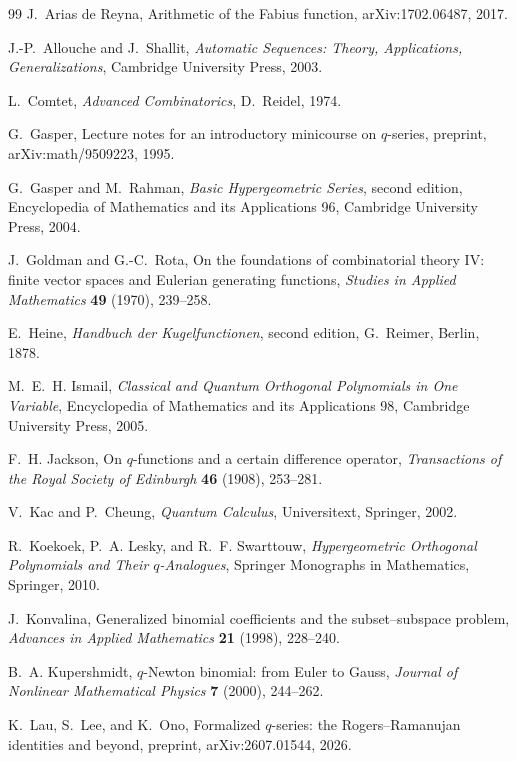 \documentclass[11pt,oneside,openany]{book}
\theoremstyle{definition}
\theoremstyle{remark}
\begin{document}
\begin{thebibliography}{99}
J.~Arias de Reyna,
Arithmetic of the Fabius function,
arXiv:1702.06487, 2017.

J.-P.~Allouche and J.~Shallit,
\emph{Automatic Sequences: Theory, Applications, Generalizations},
Cambridge University Press, 2003.

L.~Comtet,
\emph{Advanced Combinatorics},
D.~Reidel, 1974.

G.~Gasper,
Lecture notes for an introductory minicourse on $q$-series,
preprint, arXiv:math/9509223, 1995.

G.~Gasper and M.~Rahman,
\emph{Basic Hypergeometric Series}, second edition,
Encyclopedia of Mathematics and its Applications 96, Cambridge University Press, 2004.

J.~Goldman and G.-C.~Rota,
On the foundations of combinatorial theory IV: finite vector spaces and Eulerian generating functions,
\emph{Studies in Applied Mathematics} \textbf{49} (1970), 239--258.

E.~Heine,
\emph{Handbuch der Kugelfunctionen}, second edition,
G.~Reimer, Berlin, 1878.

M.~E.~H. Ismail,
\emph{Classical and Quantum Orthogonal Polynomials in One Variable},
Encyclopedia of Mathematics and its Applications 98, Cambridge University Press, 2005.

F.~H. Jackson,
On $q$-functions and a certain difference operator,
\emph{Transactions of the Royal Society of Edinburgh} \textbf{46} (1908), 253--281.

V.~Kac and P.~Cheung,
\emph{Quantum Calculus},
Universitext, Springer, 2002.

R.~Koekoek, P.~A. Lesky, and R.~F. Swarttouw,
\emph{Hypergeometric Orthogonal Polynomials and Their $q$-Analogues},
Springer Monographs in Mathematics, Springer, 2010.

J.~Konvalina,
Generalized binomial coefficients and the subset--subspace problem,
\emph{Advances in Applied Mathematics} \textbf{21} (1998), 228--240.

B.~A. Kupershmidt,
$q$-Newton binomial: from Euler to Gauss,
\emph{Journal of Nonlinear Mathematical Physics} \textbf{7} (2000), 244--262.

K.~Lau, S.~Lee, and K.~Ono,
Formalized $q$-series: the Rogers--Ramanujan identities and beyond,
preprint, arXiv:2607.01544, 2026.


\end{thebibliography}
\end{document}
